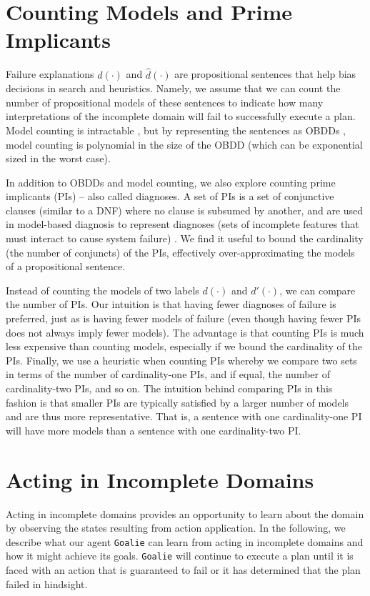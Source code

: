 \documentclass[letterpaper]{article}
\def\goalie{{\tt Goalie}}
\def\citep#1{\cite{#1}}
\begin{document}
\section{Counting Models and Prime Implicants }

Failure explanations $d(\cdot)$ and $\hat{d}(\cdot)$ are propositional sentences that help bias decisions in search and heuristics.  Namely, we assume that we can count the number of propositional models of these sentences to indicate how many interpretations of the incomplete domain will fail to successfully execute a plan.  Model counting is intractable \citep{Roth96}, but by representing the sentences as OBDDs \citep{bryant-ieeetc86}, model counting is polynomial in the size of the OBDD \citep{darwiche} (which can be exponential sized in the worst case).  

In addition to OBDDs and model counting, we also explore counting prime implicants (PIs) -- also called diagnoses.  A set of PIs is a set of conjunctive clauses (similar to a DNF) where no clause is subsumed by another, and are used in model-based diagnosis to represent diagnoses (sets of incomplete features that must interact to cause system failure) \citep{dekleer}.  We find it useful to bound the cardinality (the number of conjuncts) of the PIs, effectively over-approximating the models of a propositional sentence.  

Instead of counting the models of two labels $d(\cdot)$ and $d'(\cdot)$, we can compare the number of PIs.  Our intuition is that having fewer diagnoses of failure is preferred, just as is having fewer models of failure (even though having fewer PIs does not always imply fewer models).  The advantage is that counting PIs is much less expensive than counting models, especially if we bound the cardinality of the PIs.  Finally, we use a heuristic when counting PIs whereby we compare two sets in terms of the number of cardinality-one PIs, and if equal, the number of cardinality-two PIs, and so on.  The intuition behind comparing PIs in this fashion is that smaller PIs are typically satisfied by a larger number of models and are thus more representative.  That is, a sentence with one cardinality-one PI will have more models than a sentence with one cardinality-two PI.

\section{Acting in Incomplete Domains} Acting in incomplete domains provides an opportunity to learn about the domain by observing the states resulting from action application.  In the following, we describe what our agent \goalie{} can learn from acting in incomplete domains and how it might achieve its goals.  
\goalie{} will continue to execute a plan until it is faced with an action that is guaranteed to fail or it has determined that the plan failed in hindsight.
\end{document}
